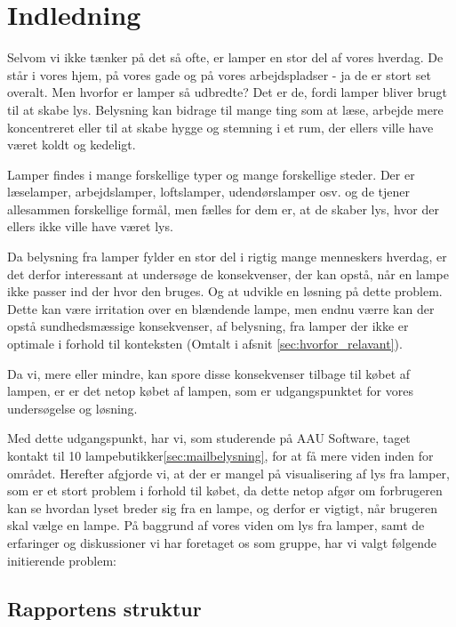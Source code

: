 \section{Indledning}
Selvom vi ikke tænker på det så ofte, er lamper en stor del af vores hverdag. De står i vores hjem, på vores gade og på vores arbejdspladser - ja de er stort set overalt. Men hvorfor er lamper så udbredte? Det er de, fordi lamper bliver brugt til at skabe lys. Belysning kan bidrage til mange ting som at læse, arbejde mere koncentreret eller til at skabe hygge og stemning i et rum, der ellers ville have været koldt og kedeligt. 

Lamper findes i mange forskellige typer og mange forskellige steder. Der er læselamper, arbejdslamper, loftslamper, udendørslamper osv. og de tjener allesammen forskellige formål, men fælles for dem er, at de skaber lys, hvor der ellers ikke ville have været lys. 

Da belysning fra lamper fylder en stor del i rigtig mange menneskers hverdag, er det derfor interessant at undersøge de konsekvenser, der kan opstå, når en lampe ikke passer ind der hvor den bruges. Og at udvikle en løsning på dette problem. Dette kan være irritation over en blændende lampe, men endnu værre kan der opstå sundhedsmæssige konsekvenser, af belysning, fra lamper der ikke er optimale i forhold til konteksten (Omtalt i afsnit \ref{sec:hvorfor_relavant}).

Da vi, mere eller mindre, kan spore disse konsekvenser tilbage til købet af lampen, er er det netop købet af lampen, som er udgangspunktet for vores undersøgelse og løsning.

Med dette udgangspunkt, har vi, som studerende på AAU Software, taget kontakt til 10 lampebutikker\ref{sec:mailbelysning}, for at få mere viden inden for området. Herefter afgjorde vi, at der er mangel på visualisering af lys fra lamper, som er et stort problem i forhold til købet, da dette netop afgør om forbrugeren kan se hvordan lyset breder sig fra en lampe, og derfor er vigtigt, når brugeren skal vælge en lampe. På baggrund af vores viden om lys fra lamper, samt de erfaringer og diskussioner vi har foretaget os som gruppe, har vi valgt følgende initierende problem:



\subsection{Rapportens struktur}

